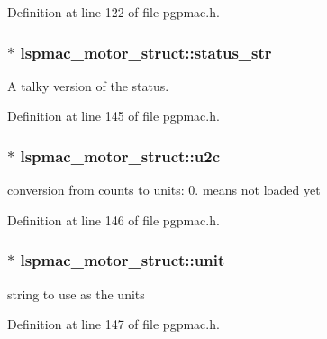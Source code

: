 Definition at line 122 of file pgpmac.\-h.

\hypertarget{structlspmac__motor__struct_aa0a6bed8379c5b1f90a4eb826cde9136}{
\subsubsection[{status\-\_\-str}]{$\ast$ lspmac\-\_\-motor\-\_\-struct\-::status\-\_\-str}}\label{structlspmac__motor__struct_aa0a6bed8379c5b1f90a4eb826cde9136}


A talky version of the status. 



Definition at line 145 of file pgpmac.\-h.

\hypertarget{structlspmac__motor__struct_a8838915ebb6f9989944117c8197d5e86}{
\subsubsection[{u2c}]{$\ast$ lspmac\-\_\-motor\-\_\-struct\-::u2c}}\label{structlspmac__motor__struct_a8838915ebb6f9989944117c8197d5e86}


conversion from counts to units\-: 0. means not loaded yet 



Definition at line 146 of file pgpmac.\-h.

\hypertarget{structlspmac__motor__struct_af8e6eb1df6b0d343fc4da93fbdd63133}{
\subsubsection[{unit}]{$\ast$ lspmac\-\_\-motor\-\_\-struct\-::unit}}\label{structlspmac__motor__struct_af8e6eb1df6b0d343fc4da93fbdd63133}


string to use as the units 



Definition at line 147 of file pgpmac.\-h.

